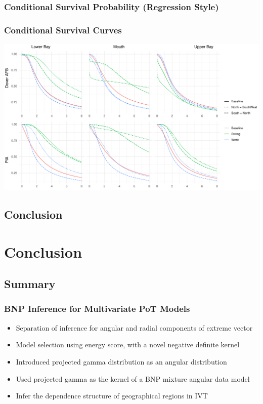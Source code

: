 \documentclass[aspectratio=169,10pt,notes]{beamer}
\newlength{\frametextheight}
\begin{document}
\subsubsection{Conditional Survival Probability (Regression Style)}

\begin{frame}
    \frametitle{Conditional Survival Curves}
    \begin{center}
        \includegraphics[height=0.99\frametextheight]{./ch3/plots/condsurv_reg/condsurv_reg_1d_std}
    \end{center}
\end{frame}

\subsection{Conclusion}

\section{Conclusion}

\subsection{Summary}

\begin{frame}
    \frametitle{BNP Inference for Multivariate PoT Models}
    \begin{itemize}
        \item Separation of inference for angular and radial components of extreme vector
        \item Model selection using energy score, with a novel negative definite kernel
        \item Introduced projected gamma distribution as an angular distribution
        \item Used projected gamma as the kernel of a BNP mixture angular data model
        \item Infer the dependence structure of geographical regions in IVT
    \end{itemize}
\end{frame}
\end{document}
